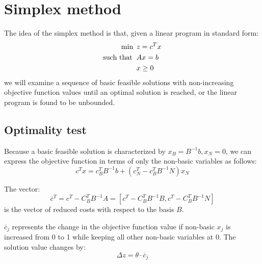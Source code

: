 \section{Simplex method}

The idea of the simplex method is that, given a linear program in standard form: 
\begin{align*}
    \min                      \:&\: z=c^Tx              \\
    \textnormal{such that }     &\: Ax=b                \\
                                &\: x \geq 0
\end{align*}
we will examine a sequence of basic feasible solutions with non-increasing objective function values until an optimal solution is reached, or the  linear program is 
found to be unbounded. 

\subsection{Optimality test}
Because a basic feasible solution is characterized by $x_B=B^{-1}b,x_N=0$, we can express the objective function in terms of only the non-basic variables as follows:
\[c^Tx=c_B^TB^{-1}b+\left(c_N^T-c_B^TB^{-1}N\right)x_N\]
\begin{definition}
    The vector: 
    \[\overline{c}^T=c^T-C_B^TB^{-1}A=\left[c^T-C_B^TB^{-1}B,c^T-C_B^TB^{-1}N\right]\]
    is the vector of reduced costs with respect to the basis $B$. 
\end{definition}
$\overline{c}_j$ represents the change in the objective function value if non-basic $x_j$ is increased from 0 to 1 while keeping all other non-basic variables at 0. 
The solution value changes by:
\[\Delta z=\theta \cdot \overline{c}_j\]

